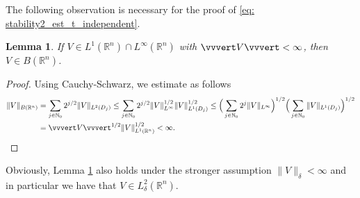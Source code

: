 \documentclass[10pt,a4paper]{amsart}
\newtheorem{lemma}[proposition]{Lemma}
\theoremstyle{remark}
\theoremstyle{definition}
\newcommand{\R}{\mathbb{R}}
\begin{document}
The following observation is necessary for the proof of \eqref{eq: stability2_est_t_independent}.
%
\begin{lemma}\label{lem: V_in_B_space}
If $V\in L^1(\R^n)\cap L^\infty(\R^n)$ with $\vvvert V \vvvert < \infty$, then $V\in B(\R^n)$. 
\end{lemma}
%
\begin{proof}
Using Cauchy-Schwarz, we estimate as follows 
%
\begin{align*}
\|V\|_{B(\R^n)} &= \sum_{j\in\mathbb N_0} 2^{j/2} \|V\|_{L^2(D_j)} \leq \sum_{j\in\mathbb N_0}2^{j/2} \|V\|_{L^\infty}^{1/2} \|V\|_{L^1(D_j)}^{1/2}
\leq \Big( \sum_{j\in\mathbb N_0} 2^j \|V\|_{L^\infty} \Big)^{1/2} \Big (  \sum_{j\in\mathbb N_0} \|V\|_{L^1(D_j)} \Big)^{1/2} \\
&= \vvvert V \vvvert^{1/2} \|V\|_{L^1(\R^n)}^{1/2} < \infty. 
\end{align*}
%
\end{proof}
%
Obviously, Lemma \ref{lem: V_in_B_space} also holds under the stronger assumption $\| V \|_\delta < \infty$ and in particular we have that $V\in L^2_\delta(\R^n)$.
%
%

\vspace{0.2cm}
\end{document}
